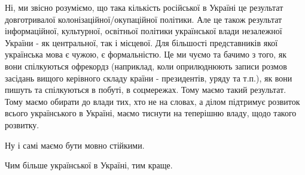 Ні, ми звісно розуміємо, що така кількість російської в Україні це результат
довготривалої колонізаційної/окупаційної політики. Але це також результат
інформаційної, культурної, освітньої політики української влади незалежної
України - як центральної, так і місцевої. Для більшості представників якої
українська мова є чужою, є формальністю. Це ми чуємо та бачимо з того, як вони
спілкуються офрекордз (наприклад, коли оприлюднюють записи розмов засідань
вищого керівного складу країни - президентів, уряду та т.п.), як вони пишуть та
спілкуються в побуті, в соцмережах. Тому маємо такий результат. Тому маємо
обирати до влади тих, хто не на словах, а ділом підтримує розвиток всього
українського в Україні, маємо тиснути на теперішню владу, щодо такого розвитку.

Ну і самі маємо бути мовно стійкими.

Чим більше української в Україні, тим краще.

